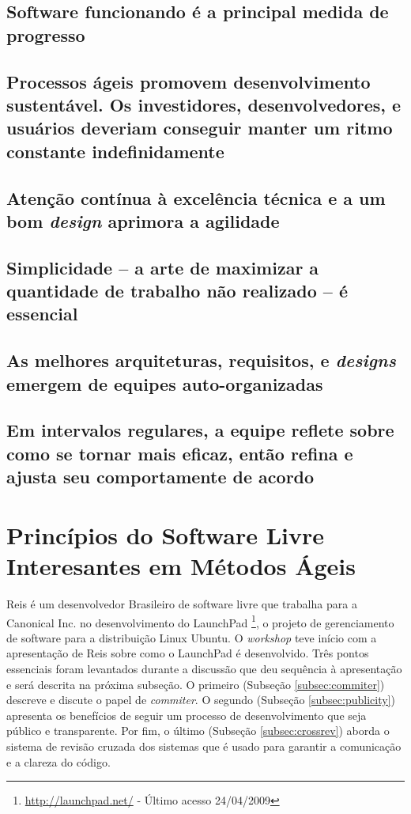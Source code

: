 \subsection{Software funcionando é a principal medida de progresso}

\subsection{Processos ágeis promovem desenvolvimento sustentável. Os
  investidores, desenvolvedores, e usuários deveriam conseguir manter
  um ritmo constante indefinidamente}

\subsection{Atenção contínua à excelência técnica e a um bom
  \textit{design} aprimora a agilidade}

\subsection{Simplicidade -- a arte de maximizar a quantidade de
  trabalho não realizado -- é essencial}

\subsection{As melhores arquiteturas, requisitos, e \textit{designs}
  emergem de equipes auto-organizadas}

\subsection{Em intervalos regulares, a equipe reflete sobre como se
  tornar mais eficaz, então refina e ajusta seu comportamente de
  acordo}

\section{Princípios do Software Livre Interesantes em Métodos Ágeis}
\label{sec:foss-over-agile}

Reis é um desenvolvedor Brasileiro de software livre que trabalha para
a Canonical Inc. no desenvolvimento do LaunchPad
\footnote{\url{http://launchpad.net/} - Último acesso 24/04/2009}, o
projeto de gerenciamento de software para a distribuição Linux
Ubuntu. O \emph{workshop} teve início com a apresentação de Reis sobre
como o LaunchPad é desenvolvido. Três pontos essenciais foram
levantados durante a discussão que deu sequência à apresentação e será
descrita na próxima subseção. O primeiro (Subseção
\ref{subsec:commiter}) descreve e discute o papel de \emph{commiter}.
O segundo (Subseção \ref{subsec:publicity}) apresenta os benefícios de
seguir um processo de desenvolvimento que seja público e transparente.
Por fim, o último (Subseção \ref{subsec:crossrev}) aborda o sistema de
revisão cruzada dos sistemas que é usado para garantir a comunicação e
a clareza do código.

